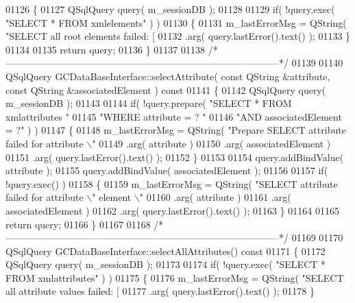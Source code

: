 \begin{DoxyCode}
{{{{{{{{{{{{{{{{{{{{{{{{{{{{{{{{{{{{{{{01126 \textcolor{keyword}{}\{
01127   QSqlQuery query( m\_sessionDB );
01128 
01129   \textcolor{keywordflow}{if}( !query.exec( \textcolor{stringliteral}{"SELECT * FROM xmlelements"} ) )
01130   \{
01131     m\_lastErrorMsg = QString( \textcolor{stringliteral}{"SELECT all root elements failed: [%
01132         .arg( query.lastError().text() );
01133   \}
01134 
01135   \textcolor{keywordflow}{return} query;
01136 \}
01137 
01138 \textcolor{comment}{/*
      --------------------------------------------------------------------------------------*/}
01139 
01140 QSqlQuery GCDataBaseInterface::selectAttribute( \textcolor{keyword}{const} QString &attribute, \textcolor{keyword}{const}
       QString &associatedElement )\textcolor{keyword}{ const}
01141 \textcolor{keyword}{}\{
01142   QSqlQuery query( m\_sessionDB );
01143 
01144   \textcolor{keywordflow}{if}( !query.prepare( \textcolor{stringliteral}{"SELECT * FROM xmlattributes "}
01145                       \textcolor{stringliteral}{"WHERE attribute = ? "}
01146                       \textcolor{stringliteral}{"AND associatedElement = ?"} ) )
01147   \{
01148     m\_lastErrorMsg = QString( \textcolor{stringliteral}{"Prepare SELECT attribute failed for attribute \(\backslash\)"
01149         .arg( attribute )
01150         .arg( associatedElement )
01151         .arg( query.lastError().text() );
01152   \}
01153 
01154   query.addBindValue( attribute );
01155   query.addBindValue( associatedElement );
01156 
01157   \textcolor{keywordflow}{if}( !query.exec() )
01158   \{
01159     m\_lastErrorMsg = QString( \textcolor{stringliteral}{"SELECT attribute failed for attribute \(\backslash\)"%
       element \(\backslash\)"%
01160         .arg( attribute )
01161         .arg( associatedElement )
01162         .arg( query.lastError().text() );
01163   \}
01164 
01165   \textcolor{keywordflow}{return} query;
01166 \}
01167 
01168 \textcolor{comment}{/*
      --------------------------------------------------------------------------------------*/}
01169 
01170 QSqlQuery GCDataBaseInterface::selectAllAttributes()\textcolor{keyword}{ const}
01171 \textcolor{keyword}{}\{
01172   QSqlQuery query( m\_sessionDB );
01173 
01174   \textcolor{keywordflow}{if}( !query.exec( \textcolor{stringliteral}{"SELECT * FROM xmlattributes"} ) )
01175   \{
01176     m\_lastErrorMsg = QString( \textcolor{stringliteral}{"SELECT all attribute values failed: [%
01177         .arg( query.lastError().text() );
01178   \}
}}}}}}}}}}}}}}}}}}}}}}}}}}}}}}}}}}}}}}}}}}}
\end{DoxyCode}
